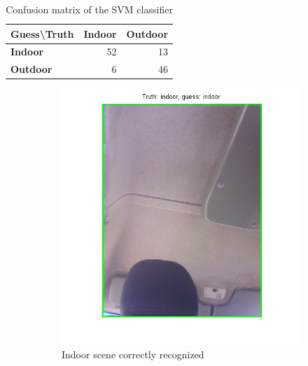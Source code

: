 \begin{table}[htb]
\centering
\begin{tabular}{l|rr}
\textbf{Guess{\textbackslash}Truth} & \textbf{Indoor} & \textbf{Outdoor} \\ \hline
\textbf{Indoor} & 52 & 13 \\
\textbf{Outdoor} & 6 & 46 \\
\end{tabular}
\caption{Confusion matrix of the SVM classifier}
\label{tab:confusion-matrix}
\end{table}

\begin{figure}[!htb]
	\centering
	\begin{subfigure}[t]{0.4\textwidth}
		\includegraphics[width=\textwidth]{./img/ex2/indoor-nailed.png}
		\caption{Indoor scene correctly recognized}
		\label{fig:indoor-nailed}
	\end{subfigure}
	~
	\begin{subfigure}[t]{0.4\textwidth}

\end{subfigure}
\end{figure}
